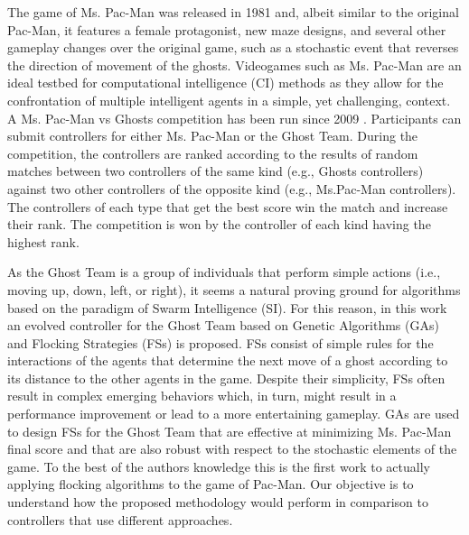 \documentclass[a4paper]{llncs}
\begin{document}
The game of Ms. Pac-Man was released in 1981 and, albeit similar to the original Pac-Man, it features a female protagonist, new maze designs, and several other gameplay changes over the original game, such as a stochastic event that reverses the direction of movement of the ghosts. Videogames such as Ms. Pac-Man are an ideal testbed for computational intelligence (CI) methods as they allow for the confrontation of multiple intelligent agents in a simple, yet challenging, context. A Ms. Pac-Man vs Ghosts competition has been run since 2009 \cite{Lucas2009}. Participants can submit controllers for either Ms. Pac-Man or the Ghost Team. During the competition, the controllers are ranked according to the results of random matches between two controllers of the same kind (e.g., Ghosts controllers) against two other controllers of the opposite kind (e.g., Ms.Pac-Man controllers). The controllers of each type that get the best score win the match and increase their rank. The competition is won by the controller of each kind having the highest rank.

As the Ghost Team is a group of individuals that perform simple actions (i.e., moving up, down, left, or right), it seems a natural proving ground for algorithms based on the paradigm of Swarm Intelligence (SI). For this reason, in this work an evolved controller for the Ghost Team based on Genetic Algorithms (GAs) and Flocking Strategies (FSs) is proposed. FSs \cite{Reynolds87} consist of simple rules for the interactions of the agents that determine the next move of a ghost according to its distance to the other agents in the game. Despite their simplicity, FSs often result in complex emerging behaviors which, in turn, might result in a performance improvement or lead to a more entertaining gameplay. GAs are used to design FSs for the Ghost Team that are effective at minimizing Ms. Pac-Man final score and that are also robust with respect to the stochastic elements of the game. To the best of the authors knowledge this is the first work to actually applying flocking algorithms to the game of Pac-Man. Our objective is to understand how the proposed methodology would perform in comparison to controllers that use different approaches.

\end{document}
